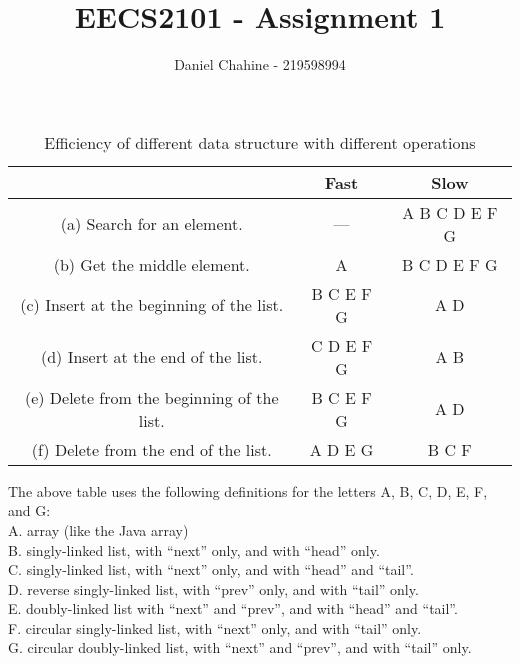 \documentclass{article}
\title{EECS2101 - Assignment 1}
\author{Daniel Chahine - 219598994}
\begin{document}
\maketitle


\begin{table}[h!]
\setlength{\tabcolsep}{25pt}
\renewcommand{\arraystretch}{1.5}
\centering
\begin{tabular}{ ||c|c|c||  }
 \hline
  & \textbf{Fast} & \textbf{Slow}\\ 
 \hline
 (a) Search for an element. & --- & A B C D E F G   \\\hline 
 (b) Get the middle element. & A & B C D E F G  \\\hline
 (c) Insert at the beginning of the list. & B C E F G & A D\\\hline
 (d) Insert at the end of the list. & C D E F G  & A B \\\hline
 (e) Delete from the beginning of the list. & B C E F G & A D \\\hline 
 (f) Delete from the end of the list. & A D E G & B C F \\
 
 \hline
\end{tabular}
\caption{Efficiency of different data structure with different operations}
\label{table:1}
\end{table}

The above table uses the following definitions for the letters A, B, C, D, E, F, and G:\\
A. array (like the Java array)\\
B. singly-linked list, with “next” only, and with “head” only.\\
C. singly-linked list, with “next” only, and with “head” and “tail”.\\
D. reverse singly-linked list, with “prev” only, and with “tail” only.\\
E. doubly-linked list with “next” and “prev”, and with “head” and “tail”.\\
F. circular singly-linked list, with “next” only, and with “tail” only.\\
G. circular doubly-linked list, with “next” and “prev”, and with “tail” only.\\

\end{document}
